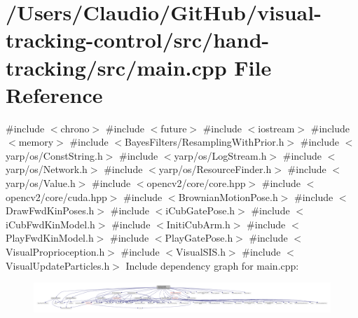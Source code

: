 \hypertarget{hand-tracking_2src_2main_8cpp}{}\section{/\+Users/\+Claudio/\+Git\+Hub/visual-\/tracking-\/control/src/hand-\/tracking/src/main.cpp File Reference}
\label{hand-tracking_2src_2main_8cpp}
{\ttfamily \#include $<$chrono$>$}\newline
{\ttfamily \#include $<$future$>$}\newline
{\ttfamily \#include $<$iostream$>$}\newline
{\ttfamily \#include $<$memory$>$}\newline
{\ttfamily \#include $<$Bayes\+Filters/\+Resampling\+With\+Prior.\+h$>$}\newline
{\ttfamily \#include $<$yarp/os/\+Const\+String.\+h$>$}\newline
{\ttfamily \#include $<$yarp/os/\+Log\+Stream.\+h$>$}\newline
{\ttfamily \#include $<$yarp/os/\+Network.\+h$>$}\newline
{\ttfamily \#include $<$yarp/os/\+Resource\+Finder.\+h$>$}\newline
{\ttfamily \#include $<$yarp/os/\+Value.\+h$>$}\newline
{\ttfamily \#include $<$opencv2/core/core.\+hpp$>$}\newline
{\ttfamily \#include $<$opencv2/core/cuda.\+hpp$>$}\newline
{\ttfamily \#include $<$Brownian\+Motion\+Pose.\+h$>$}\newline
{\ttfamily \#include $<$Draw\+Fwd\+Kin\+Poses.\+h$>$}\newline
{\ttfamily \#include $<$i\+Cub\+Gate\+Pose.\+h$>$}\newline
{\ttfamily \#include $<$i\+Cub\+Fwd\+Kin\+Model.\+h$>$}\newline
{\ttfamily \#include $<$Initi\+Cub\+Arm.\+h$>$}\newline
{\ttfamily \#include $<$Play\+Fwd\+Kin\+Model.\+h$>$}\newline
{\ttfamily \#include $<$Play\+Gate\+Pose.\+h$>$}\newline
{\ttfamily \#include $<$Visual\+Proprioception.\+h$>$}\newline
{\ttfamily \#include $<$Visual\+S\+I\+S.\+h$>$}\newline
{\ttfamily \#include $<$Visual\+Update\+Particles.\+h$>$}\newline
Include dependency graph for main.\+cpp\+:
\nopagebreak
\begin{figure}[H]
\begin{center}
\leavevmode
\includegraphics[width=350pt]{hand-tracking_2src_2main_8cpp__incl}
\end{center}
\end{figure}
